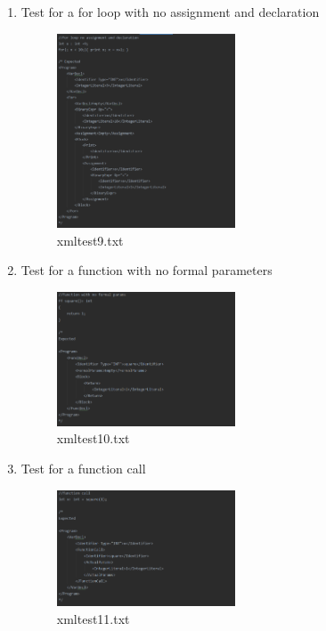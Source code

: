 \documentclass{article}
\begin{document}
\begin{enumerate}
					
												
					
				\item Test for a for loop with no assignment and declaration
					\begin{figure}[H]
					\centering
			 			\includegraphics[width=0.5\textwidth]{xmltest9.png}
			 			\centering
			  			\caption{xmltest9.txt}
			  			\label{fig:xmltest9}
					\end{figure}
					
					\item Test for a function with no formal parameters
												\begin{figure}[H]
					\centering
			 			\includegraphics[width=0.5\textwidth]{xmltest10.png}
			 			\centering
			  			\caption{xmltest10.txt}
			  			\label{fig:xmltest10}
					\end{figure}
					
			
					\item Test for a function call
					\begin{figure}[H]
					\centering
			 			\includegraphics[width=0.5\textwidth]{xmltest11.png}
			 			\centering
			  			\caption{xmltest11.txt}
			  			\label{fig:xmltest11}
					\end{figure}
					

\end{enumerate}
\end{document}
